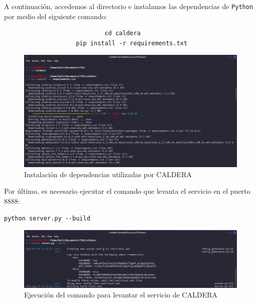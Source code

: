A continuación, accedemos al directorio e instalamos las dependencias de \texttt{Python} por medio del siguiente comando:

\begin{center}
    \footnotesize
    \begin{mdframed}
            \begin{verbatim}
                            cd caldera
                    pip install -r requirements.txt
    \end{verbatim}
    \end{mdframed}
\end{center}

\vspace{-4mm}

\begin{figure}[H]
    \centering
    \includegraphics[width=1\linewidth]{imagenes/pip-install-requirements.png}
    \caption{Instalación de dependencias utilizadas por CALDERA}
    \label{fig:install-requirements}
\end{figure}

Por último, es necesario ejecutar el comando que levanta el servicio en el puerto 8888:

\begin{center}
    \footnotesize
    \begin{mdframed}
            \begin{verbatim}
python server.py --build 
            \end{verbatim}
    \end{mdframed}
\end{center}

\vspace{-4mm}

\begin{figure}[H]
    \centering
    \includegraphics[width=1\linewidth]{imagenes/build-caldera.png}
    \caption{Ejecución del comando para levantar el servicio de \gls{CALDERA}}
    \label{fig:build_caldera-1}
\end{figure}

